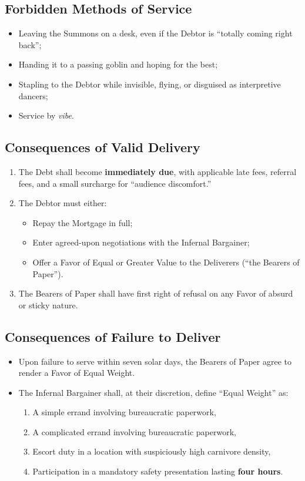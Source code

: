 \begin{tcolorbox}[title={\centering \textbf{Celestial Menagerie -- Infernal Mortgage Contract}},colback=white,colframe=black!60]
\subsection*{Forbidden Methods of Service}
\begin{itemize}
  \item Leaving the Summons on a desk, even if the Debtor is ``totally coming right back''; 
  \item Handing it to a passing goblin and hoping for the best;
  \item Stapling to the Debtor while invisible, flying, or disguised as interpretive dancers;
  \item Service by \emph{vibe}.
\end{itemize}

\subsection*{Consequences of Valid Delivery}
\begin{enumerate}
  \item The Debt shall become \textbf{immediately due}, with applicable late fees, referral fees, and a small surcharge for ``audience discomfort.''
  \item The Debtor must either:
  \begin{itemize}
    \item Repay the Mortgage in full;
    \item Enter agreed-upon negotiations with the Infernal Bargainer;
    \item Offer a Favor of Equal or Greater Value to the Deliverers (``the Bearers of Paper'').
  \end{itemize}
  \item The Bearers of Paper shall have first right of refusal on any Favor of absurd or sticky nature.
\end{enumerate}

\subsection*{Consequences of Failure to Deliver}
\begin{itemize}
  \item Upon failure to serve within seven solar days, the Bearers of Paper agree to render a Favor of Equal Weight.
  \item The Infernal Bargainer shall, at their discretion, define ``Equal Weight'' as:
  \begin{enumerate}[label=\roman*.]
    \item A simple errand involving bureaucratic paperwork,
    \item A complicated errand involving bureaucratic paperwork,
    \item Escort duty in a location with suspiciously high carnivore density,
    \item Participation in a mandatory safety presentation lasting \textbf{four hours}.
  \end{enumerate}
\end{itemize}


\end{tcolorbox}
